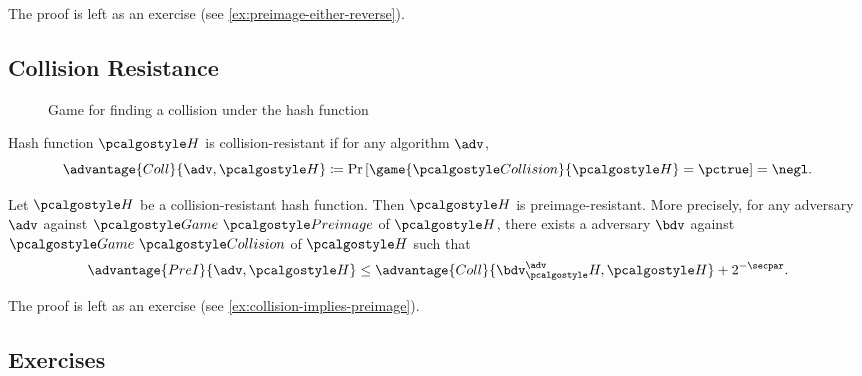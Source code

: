The proof is left as an exercise (see \autoref{ex:preimage-either-reverse}).


\subsection{Collision Resistance}

\begin{figure}[tbhp]
  \begin{center}
    \begin{tcolorbox}[width=8cm]
      \begin{pchstack}[center]
      \end{pchstack}
    \end{tcolorbox}
  \end{center}
  \caption{Game for finding a collision under the hash function \label{fig:break-hash-collision}}
\end{figure}

\begin{definition}
  Hash function $\algo{H}$ is collision-resistant if for any \ppt algorithm $\adv$,
 \[
  \advantage{Coll}{\adv, \algo{H}} \defeq \pr{\game{\algo{Collision}}{\algo{H}} = \pctrue} = \negl.
 \]
\end{definition}

\begin{theorem}\label{thm:collision-implies-preimage}
  Let $\algo{H}$ be a collision-resistant hash function. Then $\algo{H}$ is preimage-resistant.
  More precisely, for any \ppt adversary $\adv$ against $\Game~\algo{Preimage}$ of $\algo{H}$, there exists a \ppt adversary $\bdv$ against $\Game~\algo{Collision}$ of $\algo{H}$ such that
    \[
    \advantage{PreI}{\adv, \algo{H}} \le \advantage{Coll}{\bdv^\adv_\algo{H}, \algo{H}} + 2^{-\secpar}.
    \]

\end{theorem}

The proof is left as an exercise (see \autoref{ex:collision-implies-preimage}).

\subsection{Exercises}

